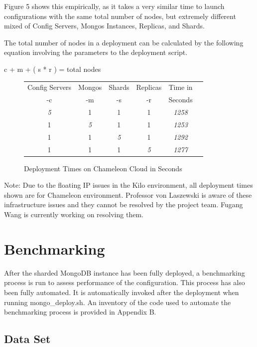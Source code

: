 \documentclass[9pt,twocolumn,twoside]{styles/osajnl}
\begin{document}
Figure 5 shows this empirically, as it takes a very similar time to launch configurations with the same total number of nodes, but extremely different mixed of Config Servers, Mongos Instances, Replicas, and Shards.

The total number of nodes in a deployment can be calculated by the following equation involving the parameters to the deployment script.

c + m + ( s * r ) = total nodes

\begin{figure}[ht]
\begin{center}
 \begin{tabular}{| c | c | c | c | c | c |} 
 \hline
Config Servers &  Mongos & Shards & Replicas & Time in \\
-c &  -m & -s & -r & Seconds
\\ [0.5ex] 
 \hline
 \hline
\emph{5} & 1 & 1 & 1 & \emph{1258} \\
 \hline
 1 & \emph{5}  & 1 & 1 & \emph{1253} \\
 \hline
 1 & 1 & \emph{5} & 1 & \emph{1292} \\
 \hline
 1 & 1 & 1 & \emph{5}  & \emph{1277}  \\ [1ex] 
 \hline
\end{tabular}
\end{center}
  \caption{Deployment Times on Chameleon Cloud in Seconds}
\end{figure}

Note: Due to the floating IP issues in the Kilo environment, all deployment times shown are for Chameleon environment.  Professor von Laszewski is aware of these infrastructure issues and they cannot be resolved by the project team.  Fugang Wang is currently working on resolving them.


\section{Benchmarking}

After the sharded MongoDB instance has been fully deployed, a benchmarking process is run to assess performance of the configuration.  This process has also been fully automated.  It is automatically invoked after the deployment when running mongo\_deploy.sh.  An inventory of the code used to automate the benchmarking process is provided in Appendix B.


\subsection{Data Set}
\end{document}

